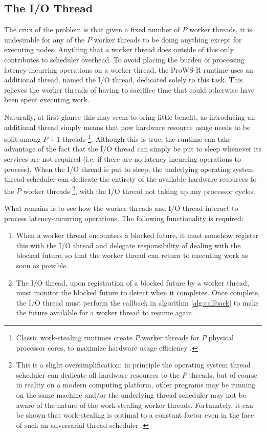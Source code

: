 \documentclass[bsc,frontabs,singlespacing,parskip,deptreport,normalheadings]{infthesis}
\begin{document}
\subsection{The I/O Thread}

The crux of the problem is that given a fixed number of \(P\) worker threads, it
is undesirable for any of the \(P\) worker threads to be doing anything except
for executing nodes. Anything that a worker thread does outside of this only
contributes to scheduler overhead. To avoid placing the burden of processing
latency-incurring operations on a worker thread, the ProWS-R runtime uses an
additional thread, named the I/O thread, dedicated solely to this task. This
relieves the worker threads of having to sacrifice time that could otherwise
have been spent executing work.

Naturally, at first glance this may seem to bring little benefit, as introducing
an additional thread simply means that now hardware resource usage needs to be
split among \(P + 1\) threads \footnote{Classic work-stealing runtimes create
    \(P\) worker threads for \(P\) physical processor cores, to maximize
hardware usage efficiency \cite{arora_thread_1998}.}. Although this is true, the
runtime can take advantage of the fact that the I/O thread can simply be put to
sleep whenever its services are not required (i.e. if there are no latency
incurring operations to process). When the I/O thread is put to sleep, the
underlying operating system thread scheduler can dedicate the entirety of the
available hardware resources to the \(P\) worker threads \footnote{This is a
    slight oversimplification: in principle the operating system thread
    scheduler can dedicate all hardware resources to the \(P\) threads, but of
    course in reality on a modern computing platform, other programs may be
    running on the same machine and/or the underlying thread scheduler may not
    be aware of the nature of the work-stealing worker threads. Fortunately, it
can be shown that work-stealing is optimal to a constant factor even in the face
of such an adversarial thread scheduler \cite{arora_thread_1998}.}, with the I/O
thread not taking up any processor cycles.

What remains is to see how the worker threads and I/O thread interact to process
latency-incurring operations. The following functionality is required:

\begin{enumerate}
    \item \label{item:register_with_io_thread} When a worker thread encounters a
        blocked future, it must somehow register this with the I/O thread and
        delegate responsibility of dealing with the blocked future, so that the
        worker thread can return to executing work as soon as possible.
    \item \label{item:monitor_future} The I/O thread, upon registration of a
        blocked future by a worker thread, must monitor the blocked future to
        detect when it completes. Once complete, the I/O thread must perform the
        callback in algorithm \ref{alg:callback} to make the future available
        for a worker thread to resume again.
\end{enumerate}
\end{document}
